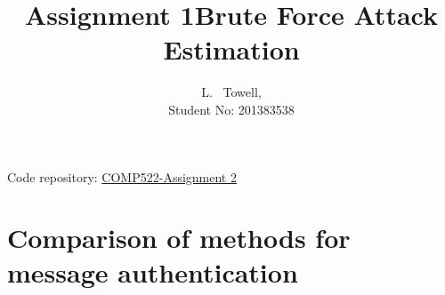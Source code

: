 \documentclass[a4paper, twoside, 11pt]{article}
\author{L. ~Towell,\\ Student No: 201383538}
\title{Assignment 1\break Brute Force Attack Estimation}
\begin{document}
	\maketitle

\maketitle
\begin{center}
Code repository: \href{https://github.com/luketowell/COMP522-Assignment2}{COMP522-Assignment 2}
\end{center}

\section{Comparison of methods for message authentication}
\end{document}
